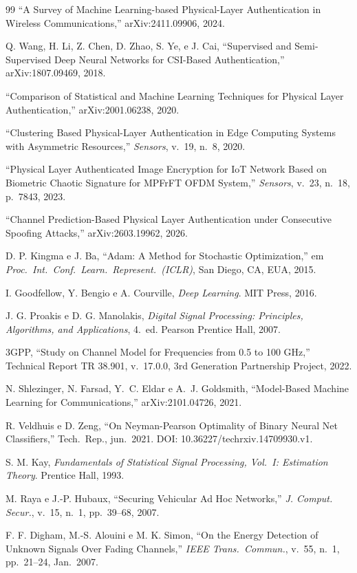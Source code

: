 \documentclass[12pt,a4paper]{article}
\begin{document}
\begin{thebibliography}{99}
 ``A Survey of Machine Learning-based Physical-Layer Authentication in Wireless Communications,'' arXiv:2411.09906, 2024.

 Q. Wang, H. Li, Z. Chen, D. Zhao, S. Ye, e J. Cai, ``Supervised and Semi-Supervised Deep Neural Networks for CSI-Based Authentication,'' arXiv:1807.09469, 2018.

 ``Comparison of Statistical and Machine Learning Techniques for Physical Layer Authentication,'' arXiv:2001.06238, 2020.

 ``Clustering Based Physical-Layer Authentication in Edge Computing Systems with Asymmetric Resources,'' \textit{Sensors}, v.~19, n.~8, 2020.

 ``Physical Layer Authenticated Image Encryption for IoT Network Based on Biometric Chaotic Signature for MPFrFT OFDM System,'' \textit{Sensors}, v.~23, n.~18, p.~7843, 2023.

 ``Channel Prediction-Based Physical Layer Authentication under Consecutive Spoofing Attacks,'' arXiv:2603.19962, 2026.

 D. P. Kingma e J. Ba, ``Adam: A Method for Stochastic Optimization,'' em \textit{Proc.\ Int.\ Conf.\ Learn.\ Represent.\ (ICLR)}, San Diego, CA, EUA, 2015.

 I. Goodfellow, Y. Bengio e A. Courville, \textit{Deep Learning}. MIT Press, 2016.

 J. G. Proakis e D. G. Manolakis, \textit{Digital Signal Processing: Principles, Algorithms, and Applications}, 4.~ed. Pearson Prentice Hall, 2007.

 3GPP, ``Study on Channel Model for Frequencies from 0.5 to 100 GHz,'' Technical Report TR 38.901, v.~17.0.0, 3rd Generation Partnership Project, 2022.

 N. Shlezinger, N. Farsad, Y.~C. Eldar e A.~J. Goldsmith, ``Model-Based Machine Learning for Communications,'' arXiv:2101.04726, 2021.

 R. Veldhuis e D. Zeng, ``On Neyman-Pearson Optimality of Binary Neural Net Classifiers,'' Tech.\ Rep., jun.\ 2021. DOI: 10.36227/techrxiv.14709930.v1.

 S. M. Kay, \textit{Fundamentals of Statistical Signal Processing, Vol.~I: Estimation Theory}. Prentice Hall, 1993.

 M. Raya e J.-P. Hubaux, ``Securing Vehicular Ad Hoc Networks,'' \textit{J. Comput. Secur.}, v.~15, n.~1, pp.~39--68, 2007.

 F. F. Digham, M.-S. Alouini e M. K. Simon, ``On the Energy Detection of Unknown Signals Over Fading Channels,'' \textit{IEEE Trans.\ Commun.}, v.~55, n.~1, pp.~21--24, Jan.\ 2007.

\end{thebibliography}
\end{document}
